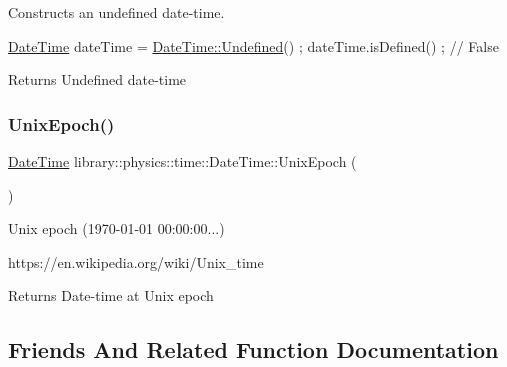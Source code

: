 Constructs an undefined date-\/time. 


\begin{DoxyCode}
\hyperlink{classlibrary_1_1physics_1_1time_1_1_date_time_a4ea629e533f335c928e037c4ead4646e}{DateTime} dateTime = \hyperlink{classlibrary_1_1physics_1_1time_1_1_date_time_a0e3772033a2cdd3a0c4dca7aac7a53ae}{DateTime::Undefined}() ;
dateTime.isDefined() ; \textcolor{comment}{// False}
\end{DoxyCode}


\begin{DoxyReturn}{Returns}
Undefined date-\/time 
\end{DoxyReturn}
\mbox{\label{classlibrary_1_1physics_1_1time_1_1_date_time_afc52d4f5c9c6e6e13e4c16e0f15018f6}} 
\subsubsection{\texorpdfstring{Unix\+Epoch()}{UnixEpoch()}}
{\footnotesize\ttfamily \hyperlink{classlibrary_1_1physics_1_1time_1_1_date_time}{Date\+Time} library\+::physics\+::time\+::\+Date\+Time\+::\+Unix\+Epoch (\begin{DoxyParamCaption}{ }\end{DoxyParamCaption})\hspace{0.3cm}{\ttfamily [static]}}



Unix epoch (1970-\/01-\/01 00\+:00\+:00...) 

https\+://en.wikipedia.\+org/wiki/\+Unix\+\_\+time

\begin{DoxyReturn}{Returns}
Date-\/time at Unix epoch 
\end{DoxyReturn}


\subsection{Friends And Related Function Documentation}
\mbox{\label{classlibrary_1_1physics_1_1time_1_1_date_time_afd7a10118810d4133db2044ddbb7e001}} 
